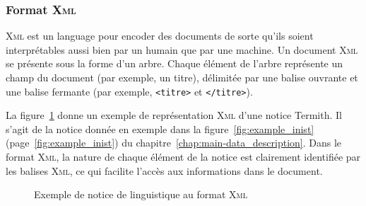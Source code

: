       \subsubsection{Format \textsc{Xml}}
      \label{subsubsec:main-automatic_evaluation_of_keyphrase_annotation-methodology-data_format-xml}
        \textsc{Xml} est un language pour encoder des documents de sorte qu'ils
        soient interprétables aussi bien par un humain que par une machine. Un
        document \textsc{Xml} se présente sous la forme d'un arbre. Chaque
        élément de l'arbre représente un champ du document (par exemple, un
        titre), délimitée par une balise ouvrante et une balise fermante (par
        exemple, \texttt{<titre>} et \texttt{</titre>}).

        La figure~\ref{fig:xml_example} donne un exemple de représentation
        \textsc{Xml} d'une notice Termith. Il s'agit de la notice donnée en
        exemple dans la figure~\ref{fig:example_inist}
        (page~\ref{fig:example_inist}) du
        chapitre~\ref{chap:main-data_description}. Dans le format \textsc{Xml},
        la nature de chaque élément de la notice est clairement identifiée par
        les balises \textsc{Xml}, ce qui facilite l'accès aux informations dans
        le document.
        \begin{figure}[h!]
          \setlstxml
          
          \caption{Exemple de notice de linguistique au format \textsc{Xml}
                   \label{fig:xml_example}}
        \end{figure}

